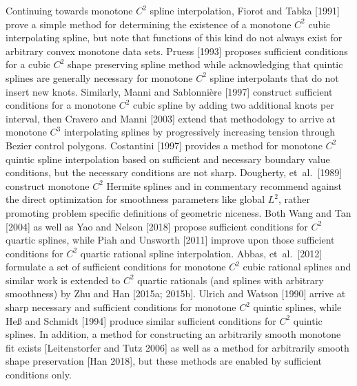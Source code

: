 Continuing towards monotone $C^2$ spline interpolation, Fiorot and
Tabka [1991] prove a simple method for determining the existence of a
monotone $C^2$ cubic interpolating spline, but note that functions of
this kind do not always exist for arbitrary convex monotone data sets.
Pruess [1993] proposes sufficient conditions for a cubic $C^2$ shape
preserving spline method while acknowledging that quintic splines are
generally necessary for monotone $C^2$ spline interpolants that do not
insert new knots. Similarly, Manni and Sablonni\`ere [1997] construct
sufficient conditions for a monotone $C^2$ cubic spline by adding two
additional knots per interval, then Cravero and Manni [2003] extend
that methodology to arrive at monotone $C^3$ interpolating splines by
progressively increasing tension through Bezier control
polygons. Costantini [1997] provides a method for monotone $C^2$
quintic spline interpolation based on sufficient and necessary
boundary value conditions, but the necessary conditions are not
sharp. Dougherty, et\ al.\ [1989] construct monotone $C^2$ Hermite
splines and in commentary recommend against the direct optimization
for smoothness parameters like global $L^2$, rather promoting problem
specific definitions of geometric niceness. Both Wang and Tan [2004]
as well as Yao and Nelson [2018] propose sufficient conditions for
$C^2$ quartic splines, while Piah and Unsworth [2011] improve upon
those sufficient conditions for $C^2$ quartic rational spline
interpolation. Abbas, et\ al.\ [2012] formulate a set of sufficient
conditions for monotone $C^2$ cubic rational splines and similar work
is extended to $C^2$ quartic rationals (and splines with arbitrary
smoothness) by Zhu and Han [2015a; 2015b]. Ulrich and Watson [1990]
arrive at sharp necessary and sufficient conditions for monotone $C^2$
quintic splines, while He{\ss} and Schmidt [1994] produce similar
sufficient conditions for $C^2$ quintic splines. In addition, a method
for constructing an arbitrarily smooth monotone fit exists
[Leitenstorfer and Tutz 2006] as well as a method for arbitrarily
smooth shape preservation [Han 2018], but these methods are enabled by
sufficient conditions only.

